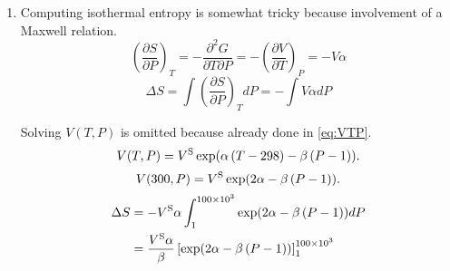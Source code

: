 \begin{@empty}
\begin{answer}
\begin{enumerate}
            Isobaric specific heat capacity of selected elements can be found
            in Appendix B.
            \[ C_P = 11.17 + \num{37.78e-3}\,T + \frac{\num{3.18e5}}{T^2} \left( \si{\joule\per\mol\per\kelvin} \right) \]

            Heat capacity has the same dimension as entropy.
            \begin{align*}
                \Delta S &= \int_{300}^{1300} \left( \frac{11.17}{T} + \num{37.78e-3} + \frac{\num{3.18e5}}{T^3} \right) dT \\
                    &= \left[ 11.17 \ln T + \num{37.78e-3}\, T - \frac{\num{1.59e5}}{T^2} \right]_{300}^{1300} \\
                    &= 11.17 \ln \frac{1300}{300} + 37.78
                        + \num{1.59e5} \left( \frac{1}{300^2} - \frac{1}{1300^2} \right) \\
                    &\approx 55.83 \left( \si{\joule\per\mol\per\kelvin} \right)
            \end{align*}

        \item Computing isothermal entropy is somewhat tricky because
            involvement of a Maxwell relation.
            \[
                \left( \frac{\partial S}{\partial P} \right)_T
                = -\frac{\partial^2 G}{\partial T \partial P}
                = -\left( \frac{\partial V}{\partial T} \right)_P
                = -V \alpha
            \]
            \[ \Delta S = \int \left( \frac{\partial S}{\partial P} \right)_T dP = -\int V \alpha dP \]

            Solving $V(T, P)$ is omitted because already done in
            \eqref{eq:VTP}.
            \[
                V(T, P) = V^{\text S} \exp \Left(
                    \alpha \left( T - 298 \right)
                    - \beta \left( P - 1 \right) \Right).
            \]
            \[
                V(300, P) = V^{\text S} \exp \Left(
                    2 \alpha
                    - \beta \left( P - 1 \right) \Right).
            \]
            \begin{align*}
                \Delta S &= -V^{\text S} \alpha \int_1^{\num{100e3}}
                    \exp \Left( 2 \alpha - \beta \left( P - 1 \right) \Right) dP \\
                &= \frac{V^{\text S} \alpha}{\beta}
                    \left[ \exp \Left( 2 \alpha - \beta \left( P - 1 \right) \Right) \right]_1^{\num{100e3}}
            \end{align*}


\end{enumerate}
\end{answer}
\end{@empty}

